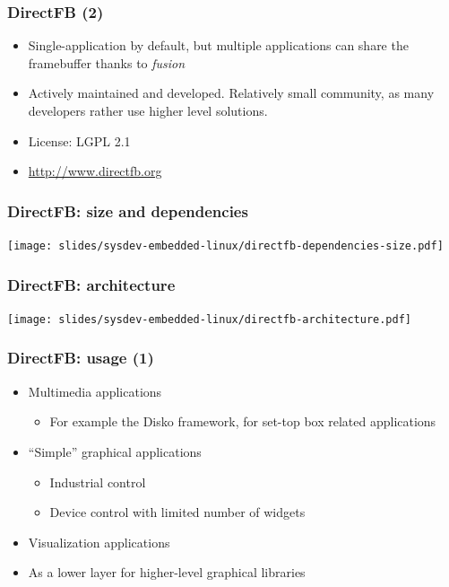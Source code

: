 \begin{frame}
  \frametitle{DirectFB (2)}
  \begin{itemize}
  \item Single-application by default, but multiple applications can
    share the framebuffer thanks to {\em fusion}
  \item Actively maintained and developed. Relatively small community,
    as many developers rather use higher level solutions.
  \item License: LGPL 2.1
  \item \url{http://www.directfb.org}
  \end{itemize}
\end{frame}

\begin{frame}
  \frametitle{DirectFB: size and dependencies}
  \begin{center}
    \texttt{[image: slides/sysdev-embedded-linux/directfb-dependencies-size.pdf]}
  \end{center}
\end{frame}

\begin{frame}
  \frametitle{DirectFB: architecture}
  \begin{center}
    \texttt{[image: slides/sysdev-embedded-linux/directfb-architecture.pdf]}
  \end{center}
\end{frame}

\begin{frame}
  \frametitle{DirectFB: usage (1)}
  \begin{itemize}
  \item Multimedia applications
    \begin{itemize}
    \item For example the Disko framework, for set-top box related
      applications
    \end{itemize}
  \item ``Simple'' graphical applications
    \begin{itemize}
    \item Industrial control
    \item Device control with limited number of widgets
    \end{itemize}
  \item Visualization applications
  \item As a lower layer for higher-level graphical libraries
  \end{itemize}
\end{frame}

